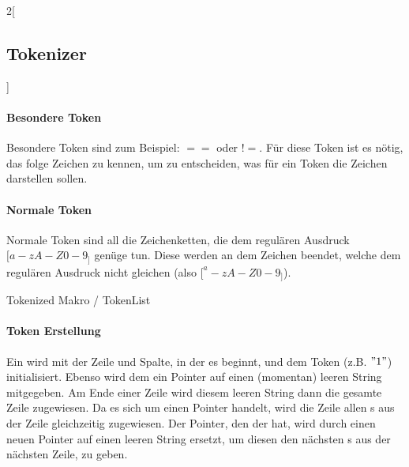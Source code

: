 \begin{paracol}{2}[\subsection{Tokenizer}]
      \paragraph{Besondere Token}
        Besondere Token sind zum Beispiel: \myRIn$==$ oder \myRIn$!=$. Für diese Token ist es nötig, das folge Zeichen zu kennen, um zu entscheiden, was für ein Token die Zeichen darstellen sollen.

      \paragraph{Normale Token}
        Normale Token sind all die Zeichenketten, die dem regulären Ausdruck \myRIn$[a-zA-Z0-9_]$ genüge tun. Diese werden an dem Zeichen beendet, welche dem regulären Ausdruck nicht gleichen (also \myRIn$[^a-zA-Z0-9_]$).

    \switchcolumn
      \begin{myCodeEnv}
        \begin{myInvBox}[width=.9\linewidth]
          
        \caption{Tokenized Makro / TokenList}
        \label{fig:extok}
        \end{myInvBox}
      \end{myCodeEnv}
  \end{paracol}

  \paragraph{Token Erstellung}
    Ein  wird mit der Zeile und Spalte, in der es beginnt, und dem Token (z.B. \myMIn$"1 "$) initialisiert. Ebenso wird dem  ein Pointer auf einen (momentan) leeren String mitgegeben. Am Ende einer Zeile wird diesem leeren String dann die gesamte Zeile zugewiesen. Da es sich um einen Pointer handelt, wird die Zeile allen s aus der Zeile gleichzeitig zugewiesen. Der Pointer, den der  hat, wird durch einen neuen Pointer auf einen leeren String ersetzt, um diesen den nächsten s aus der nächsten Zeile, zu geben.

